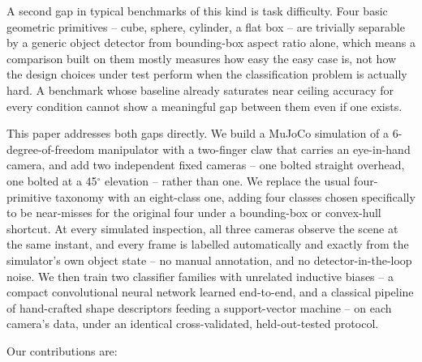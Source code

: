 \documentclass[conference]{IEEEtran}
\begin{document}
A second gap in typical benchmarks of this kind is task difficulty. Four basic geometric primitives -- cube, sphere, cylinder, a flat box -- are trivially separable by a generic object detector from bounding-box aspect ratio alone, which means a comparison built on them mostly measures how easy the easy case is, not how the design choices under test perform when the classification problem is actually hard. A benchmark whose baseline already saturates near ceiling accuracy for every condition cannot show a meaningful gap between them even if one exists.

This paper addresses both gaps directly. We build a MuJoCo simulation of a 6-degree-of-freedom manipulator with a two-finger claw that carries an eye-in-hand camera, and add two independent fixed cameras -- one bolted straight overhead, one bolted at a 45$^\circ$ elevation -- rather than one. We replace the usual four-primitive taxonomy with an eight-class one, adding four classes chosen specifically to be near-misses for the original four under a bounding-box or convex-hull shortcut. At every simulated inspection, all three cameras observe the scene at the same instant, and every frame is labelled automatically and exactly from the simulator's own object state -- no manual annotation, and no detector-in-the-loop noise. We then train two classifier families with unrelated inductive biases -- a compact convolutional neural network learned end-to-end, and a classical pipeline of hand-crafted shape descriptors feeding a support-vector machine -- on each camera's data, under an identical cross-validated, held-out-tested protocol.

Our contributions are:
\end{document}
